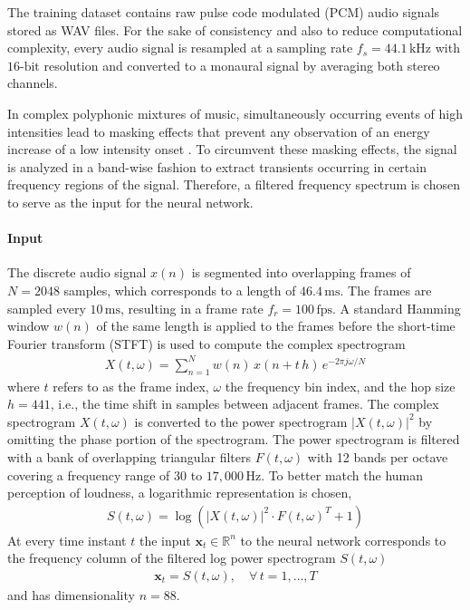 \documentclass{scrartcl}
\begin{document}
The training dataset contains raw pulse code modulated (PCM) audio signals stored as WAV files. For the sake of consistency and also to reduce computational complexity, every audio signal is resampled at a sampling rate $f_s = 44.1 \,\text{kHz}$ with $16\text{-bit}$ resolution and converted to a monaural signal by averaging both stereo channels. 

In complex polyphonic mixtures of music, simultaneously occurring events of high intensities lead to masking effects that prevent any observation of an energy increase of a low intensity onset \cite{Grosche2010}. To circumvent these masking effects, the signal is analyzed in a band-wise fashion to extract transients occurring in certain frequency regions of the signal. Therefore, a filtered frequency spectrum is chosen to serve as the input for the neural network.


\paragraph{Input}

The discrete audio signal $x(n)$ is segmented into overlapping frames of $N = 2048$ samples, which corresponds to a length of $46.4 \,\text{ms}$. The frames are sampled every $10 \,\text{ms}$, resulting in a frame rate $f_r = 100 \,\text{fps}$. A standard Hamming window $w(n)$ of the same length is applied to the frames before the short-time Fourier transform (STFT) is used to compute the complex spectrogram 
\begin{align}
X(t,\omega) = \sum_{n = 1}^{N} w(n) \, x(n + t\,h) \, e^{-2 \pi j \omega /N}
\end{align} 
where $t$ refers to as the frame index, $\omega$ the frequency bin index, and the hop size $h=441$, i.e., the time shift in samples between adjacent frames. The complex spectrogram $X(t,\omega)$ is converted to the power spectrogram $|X(t,\omega)|^2$ by omitting the phase portion of the spectrogram. The power spectrogram is filtered with a bank of overlapping triangular filters $F(t,\omega)$ with 12 bands per octave covering a frequency range of $30$ to $17,000 \, \text{Hz}$. To better match the human perception of loudness, a logarithmic representation is chosen, 
\begin{align}
S(t,\omega) = \log \left( |X(t,\omega)|^2 \cdot F(t,\omega)^T + 1 \right)
\end{align} 
At every time instant $t$ the input  $\mathbf x_t \in \mathbb R^n$ to the neural network corresponds to the frequency column of the filtered log power spectrogram $S(t,\omega)$
\begin{align}
\mathbf x_t = S(t,\omega), \quad \forall\, t= 1,\dots,T
\end{align} 
and has dimensionality $n=88$.
\end{document}
